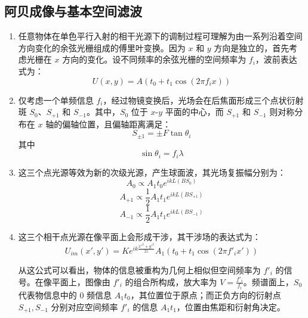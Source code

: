 \documentclass[UTF-8,twoside,cs4size]{ctexart}
\begin{document}
\subsection{阿贝成像与基本空间滤波}
\begin{enumerate}
    \item 任意物体在单色平行入射的相干光源下的调制过程可理解为由一系列沿着空间方向变化的余弦光栅组成的傅里叶变换。因为 \( x \) 和 \( y \) 方向是独立的，首先考虑光栅在 \( x \) 方向的变化。设不同频率的余弦光栅的空间频率为 \( f_i \)，波前表达式为：
    \begin{equation}
        U(x, y) = A\left(t_0 + t_1 \cos(2 \pi f_i x)\right)
    \end{equation}

    \item 仅考虑一个单频信息 \( f_i \)，经过物镜变换后，光场会在后焦面形成三个点状衍射斑 \( S_0 \)、\( S_{+1} \) 和 \( S_{-1} \)。其中，\( S_0 \) 位于 \( x \)-\( y \) 平面的中心，而 \( S_{+1} \) 和 \( S_{-1} \) 则对称分布在 \( x \) 轴的偏轴位置，且偏轴距离满足：
    \begin{equation}
        S_{\pm 1} = \pm F \tan{\theta_i}
    \end{equation}
    其中
    \begin{equation}
        \sin{\theta_i} = f_i \lambda
    \end{equation}

    \item 这三个点光源等效为新的次级光源，产生球面波，其光场复振幅分别为：
    \begin{equation}
        A_0 \propto A_1 t_0 e^{ikL(BS_0)}
    \end{equation}
    \begin{equation}
        A_{+1} \propto \frac{1}{2} A_1 t_1 e^{ikL(BS_{+1})}
    \end{equation}
    \begin{equation}
        A_{-1} \propto \frac{1}{2} A_1 t_1 e^{ikL(BS_{-1})}
    \end{equation}

    \item 这三个相干点光源在像平面上会形成干涉，其干涉场的表达式为：
    \begin{equation}
        U_{im} (x', y') = K e^{i k \frac{{x'}^2 + {y'}^2}{2z}} A_1 \left( t_0 + t_1 \cos(2 \pi f'_i x') \right)
    \end{equation}
    
    从这公式可以看出，物体的信息被重构为几何上相似但空间频率为 \( f'_i \) 的信号。在像平面上，图像由 \( f'_i \) 的组合所构成，放大率为 \( V = \frac{f'_i}{f_i} \)。频谱面上，\( S_0 \) 代表物信息中的 0 频信息 \( A_1 t_0 \)，其位置位于原点；而正负方向的衍射点 \( S_{+1}, S_{-1} \) 分别对应空间频率 \( f'_i \) 的信息 \( A_1 t_1 \)，位置由焦距和衍射角决定。
\end{enumerate}
\end{document}
